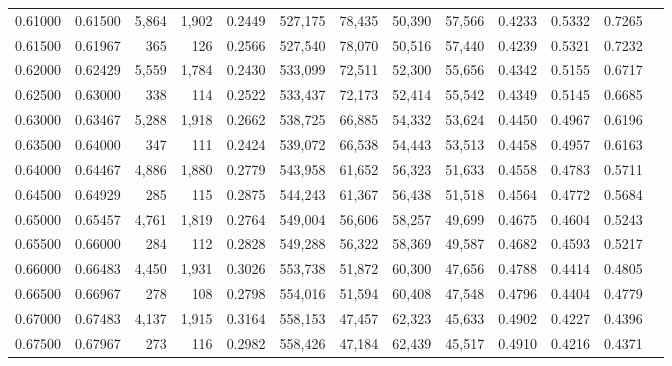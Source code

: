 \begin{tabular}{rrrrrrrrrrrrr}
0.61000 & 0.61500 &  5,864 & 1,902 &                                     0.2449 & 527,175 &  78,435 &  50,390 &  57,566 & 0.4233 & 0.5332 & 0.7265 \\
0.61500 & 0.61967 &    365 &   126 &                                     0.2566 & 527,540 &  78,070 &  50,516 &  57,440 & 0.4239 & 0.5321 & 0.7232 \\
0.62000 & 0.62429 &  5,559 & 1,784 &                                     0.2430 & 533,099 &  72,511 &  52,300 &  55,656 & 0.4342 & 0.5155 & 0.6717 \\
0.62500 & 0.63000 &    338 &   114 &                                     0.2522 & 533,437 &  72,173 &  52,414 &  55,542 & 0.4349 & 0.5145 & 0.6685 \\
0.63000 & 0.63467 &  5,288 & 1,918 &                                     0.2662 & 538,725 &  66,885 &  54,332 &  53,624 & 0.4450 & 0.4967 & 0.6196 \\
0.63500 & 0.64000 &    347 &   111 &                                     0.2424 & 539,072 &  66,538 &  54,443 &  53,513 & 0.4458 & 0.4957 & 0.6163 \\
0.64000 & 0.64467 &  4,886 & 1,880 &                                     0.2779 & 543,958 &  61,652 &  56,323 &  51,633 & 0.4558 & 0.4783 & 0.5711 \\
0.64500 & 0.64929 &    285 &   115 &                                     0.2875 & 544,243 &  61,367 &  56,438 &  51,518 & 0.4564 & 0.4772 & 0.5684 \\
0.65000 & 0.65457 &  4,761 & 1,819 &                                     0.2764 & 549,004 &  56,606 &  58,257 &  49,699 & 0.4675 & 0.4604 & 0.5243 \\
0.65500 & 0.66000 &    284 &   112 &                                     0.2828 & 549,288 &  56,322 &  58,369 &  49,587 & 0.4682 & 0.4593 & 0.5217 \\
0.66000 & 0.66483 &  4,450 & 1,931 &                                     0.3026 & 553,738 &  51,872 &  60,300 &  47,656 & 0.4788 & 0.4414 & 0.4805 \\
0.66500 & 0.66967 &    278 &   108 &                                     0.2798 & 554,016 &  51,594 &  60,408 &  47,548 & 0.4796 & 0.4404 & 0.4779 \\
0.67000 & 0.67483 &  4,137 & 1,915 &                                     0.3164 & 558,153 &  47,457 &  62,323 &  45,633 & 0.4902 & 0.4227 & 0.4396 \\
0.67500 & 0.67967 &    273 &   116 &                                     0.2982 & 558,426 &  47,184 &  62,439 &  45,517 & 0.4910 & 0.4216 & 0.4371 \\

\end{tabular}
